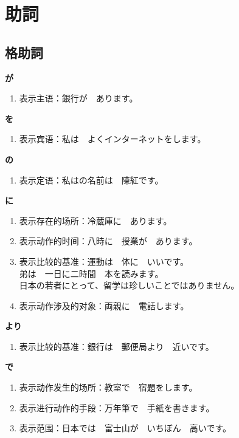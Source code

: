 \section{助詞}%
\label{sec:_}


\subsection{格助詞}%

{\bf
\noindent が
}

\begin{enumerate}
  \item 表示主语：銀行が　あります。
\end{enumerate}

{\bf
\noindent を
}

\begin{enumerate}
  \item 表示宾语：私は　よくインターネットをします。
\end{enumerate}

{\bf
\noindent の
}

\begin{enumerate}
  \item 表示定语：私はの名前は　陳紅です。
\end{enumerate}

{\bf
\noindent に
}

\begin{enumerate}
  \item 表示存在的场所：冷蔵庫に　あります。
  \item 表示动作的时间：八時に　授業が　あります。
  \item 表示比较的基准：運動は　体に　いいです。\\ 
    弟は　一日に二時間　本を読みます。\\
    日本の若者にとって、留学は珍しいことではありません。
  \item 表示动作涉及的对象：両親に　電話します。
\end{enumerate}

{\bf
\noindent より
}

\begin{enumerate}
  \item 表示比较的基准：銀行は　郵便局より　近いです。
\end{enumerate}

{\bf
\noindent で
}

\begin{enumerate}
  \item 表示动作发生的场所：教室で　宿題をします。
  \item 表示进行动作的手段：万年筆で　手紙を書きます。
  \item 表示范围：日本では　富士山が　いちぼん　高いです。
\end{enumerate}

